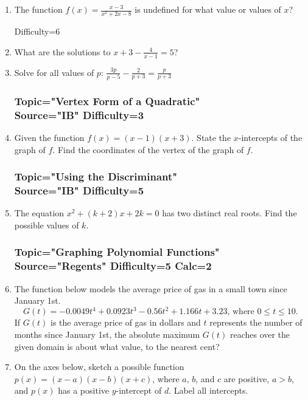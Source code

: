 \documentclass[12pt, oneside]{article}
\begin{document}
\begin{enumerate}
\item The function $\displaystyle f(x)=\frac{x-3}{x^2+2x-8}$ is undefined for what value or values of $x$? %

Difficulty=6
\item What are the solutions to $\displaystyle x+3- \frac{4}{x-1} =5$? %

\item Solve for all values of $p$: $\displaystyle \frac{3p}{p-5} - \frac{2}{p+3} =\frac{p}{p+3}$ %

\subsubsection*{Topic="Vertex Form of a Quadratic"\\
Source="IB" 
Difficulty=3}

\item Given the function $f(x)=(x-1)(x+3)$. State the $x$-intercepts of the graph of $f$. Find the coordinates of the vertex of the graph of $f$.


\subsubsection*{Topic="Using the Discriminant"\\
Source="IB" 
Difficulty=5}

\item The equation $x^2+(k+2)x+2k=0$ has two distinct real roots. Find the possible values of $k$.

\subsubsection*{Topic="Graphing Polynomial Functions"\\
Source="Regents" 
Difficulty=5 Calc=2}

\item The function below models the average price of gas in a small town since January 1st.
\[G(t)=-0.0049t^4 + 0.0923t^3 - 0.56t^2 +1.166t+3.23 \text{, where } 0 \leq t \leq 10.\]
If $G(t)$ is the average price of gas in dollars and $t$ represents the number of months since January 1st, the absolute maximum $G(t)$ reaches over the given domain is about what value, to the nearest cent? %

\item On the axes below, sketch a possible function $p(x) = (x  -a)(x - b)(x + c)$, where $a$, $b$, and $c$ are positive, $a  >b$, and $p(x)$ has a positive $y$-intercept of $d$. Label all intercepts. 
\begin{center}
\end{center} %


\end{enumerate}
\end{document}
